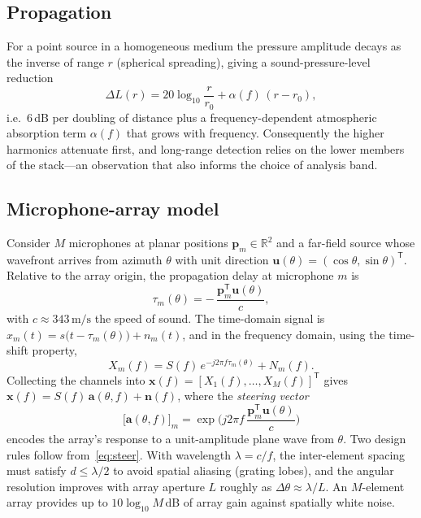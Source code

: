 \documentclass[11pt]{article}
\newcommand{\T}{^{\mathsf{T}}}
\newcommand{\xv}{\mathbf{x}}
\newcommand{\av}{\mathbf{a}}
\newcommand{\pv}{\mathbf{p}}
\newcommand{\uv}{\mathbf{u}}
\begin{document}
\subsection{Propagation}
For a point source in a homogeneous medium the pressure amplitude decays as the
inverse of range $r$ (spherical spreading), giving a sound-pressure-level
reduction
\begin{equation}
\Delta L(r) = 20\log_{10}\!\frac{r}{r_0} + \alpha(f)\,(r-r_0),
\end{equation}
i.e.\ $6$\,dB per doubling of distance plus a frequency-dependent atmospheric
absorption term $\alpha(f)$ that grows with frequency. Consequently the higher
harmonics attenuate first, and long-range detection relies on the lower members
of the stack---an observation that also informs the choice of analysis band.

\subsection{Microphone-array model}
Consider $M$ microphones at planar positions $\pv_m\in\mathbb{R}^2$ and a
far-field source whose wavefront arrives from azimuth $\theta$ with unit
direction $\uv(\theta)=(\cos\theta,\sin\theta)\T$. Relative to the array origin,
the propagation delay at microphone $m$ is
\begin{equation}
\tau_m(\theta) = -\,\frac{\pv_m\T\uv(\theta)}{c},
\end{equation}
with $c\approx343\,\mathrm{m/s}$ the speed of sound. The time-domain signal is
$x_m(t)=s\big(t-\tau_m(\theta)\big)+n_m(t)$, and in the frequency domain, using
the time-shift property,
\begin{equation}
X_m(f) = S(f)\,e^{-j2\pi f \tau_m(\theta)} + N_m(f).
\end{equation}
Collecting the channels into $\xv(f)=[X_1(f),\dots,X_M(f)]\T$ gives
$\xv(f) = S(f)\,\av(\theta,f) + \mathbf{n}(f)$, where the \emph{steering vector}
\begin{equation}
\big[\av(\theta,f)\big]_m = \exp\!\Big(j2\pi f\,\frac{\pv_m\T\uv(\theta)}{c}\Big)
\label{eq:steer}
\end{equation}
encodes the array's response to a unit-amplitude plane wave from $\theta$.
Two design rules follow from~\eqref{eq:steer}. With wavelength $\lambda=c/f$, the
inter-element spacing must satisfy $d\le\lambda/2$ to avoid spatial aliasing
(grating lobes), and the angular resolution improves with array aperture $L$
roughly as $\Delta\theta\approx\lambda/L$. An $M$-element array provides up to
$10\log_{10}M$\,dB of array gain against spatially white noise.
\end{document}
